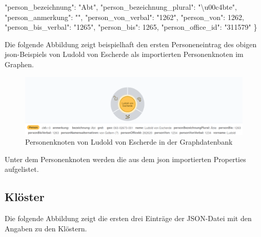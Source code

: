 \documentclass[ngerman,]{scrreprt}
\newenvironment{Shaded}{}{}
\newcommand{\DataTypeTok}[1]{\textcolor[rgb]{0.56,0.13,0.00}{#1}}
\newcommand{\DecValTok}[1]{\textcolor[rgb]{0.25,0.63,0.44}{#1}}
\newcommand{\CharTok}[1]{\textcolor[rgb]{0.25,0.44,0.63}{#1}}
\newcommand{\StringTok}[1]{\textcolor[rgb]{0.25,0.44,0.63}{#1}}
\newcommand{\FunctionTok}[1]{\textcolor[rgb]{0.02,0.16,0.49}{#1}}
\begin{document}
\begin{Shaded}
\begin{Highlighting}[]
        \DataTypeTok{"person_bezeichnung"}\FunctionTok{:} \StringTok{"Abt"}\FunctionTok{,}
        \DataTypeTok{"person_bezeichnung_plural"}\FunctionTok{:} \StringTok{"}\CharTok{\textbackslash{}u00c4}\StringTok{bte"}\FunctionTok{,}
        \DataTypeTok{"person_anmerkung"}\FunctionTok{:} \StringTok{""}\FunctionTok{,}
        \DataTypeTok{"person_von_verbal"}\FunctionTok{:} \StringTok{"1262"}\FunctionTok{,}
        \DataTypeTok{"person_von"}\FunctionTok{:} \DecValTok{1262}\FunctionTok{,}
        \DataTypeTok{"person_bis_verbal"}\FunctionTok{:} \StringTok{"1265"}\FunctionTok{,}
        \DataTypeTok{"person_bis"}\FunctionTok{:} \DecValTok{1265}\FunctionTok{,}
        \DataTypeTok{"person_office_id"}\FunctionTok{:} \StringTok{"311579"}
    \FunctionTok{\}}
\end{Highlighting}
\end{Shaded}

Die folgende Abbildung zeigt beispielhaft den ersten Personeneintrag des obigen json-Beispiels von Ludold von Escherde als importierten Personenknoten im Graphen.

\begin{figure}
\centering
\includegraphics{Bilder/Germania-Sacra-Personenknoten-mit-Properties.png}
\caption{Personenknoten von Ludold von Escherde in der Graphdatenbank}
\end{figure}

Unter dem Personenknoten werden die aus dem json importierten Properties aufgelistet.

\subsection{Klöster}\label{kluxf6ster}

Die folgende Abbildung zeigt die ersten drei Einträge der JSON-Datei mit den Angaben zu den Klöstern.
\end{document}
